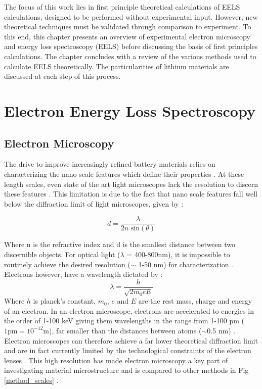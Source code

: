


The focus of this work lies in  first principle theoretical calculations of EELS calculations, designed to be performed without experimental input.  However, new theoretical techniques must be validated through comparison to experiment.  To this end, this chapter presents an overview of experimental electron microscopy and  energy loss spectroscopy (EELS) before discussing the basis of first principles calculations. The chapter concludes with a review of the various methods used to calculate EELS theoretically.  The particularities of lithium materials are discussed at each step of this process.  
 
\section{Electron Energy Loss Spectroscopy}

\subsection{Electron Microscopy}
The drive to improve increasingly refined battery materials relies on characterizing   the nano scale features which define their properties \cite{goldstein_electron_2003}.  At these length scales, even state of the art light microscopes lack the resolution to discern these features \cite{rust_sub-diffraction-limit_2006}.  This limitation is due to the fact that nano scale features fall well below the diffraction limit of light microscopes, given by \cite{hecht}: 

\begin{equation}
	d = \frac{\lambda}{2n\textrm{ sin}(\theta)}
\end{equation}

Where n is the refractive index and d is the smallest distance between two discernible objects. For optical light ($\lambda$ = 400-800nm), it is impossible to routinely achieve the desired resolution ($\sim$ 1-50 nm) for characterization \cite{rust_sub-diffraction-limit_2006}.  Electrons however, have a wavelength dictated by \cite{goldstein_electron_2003}: 
\begin{equation}
 \lambda = \frac{h}{\sqrt{2 m_0 e E}}
\end{equation}
Where $h$ is planck's constant, $m_0$, $e$ and $E$ are the rest mass, charge and energy of an electron.  In an electron microscope, electrons are accelerated to energies in the order of 1-100 keV giving them wavelengths in the range from 1-100 pm ($1\mathrm{pm}=10^{-12}$m), far  smaller than the distances between atoms ($\sim$0.5 nm) \cite{morales_laser_1998}.  Electron microscopes can therefore achieve a far lower theoretical diffraction limit  and are in fact currently limited by the technological constraints of the electron  lenses \cite{goldstein_electron_2003}.  This high resolution has made electron microscopy a key part of investigating material microstructure and is compared to other methods  in Fig \ref{method_scales} \cite{inkson_2_2016}. \\


